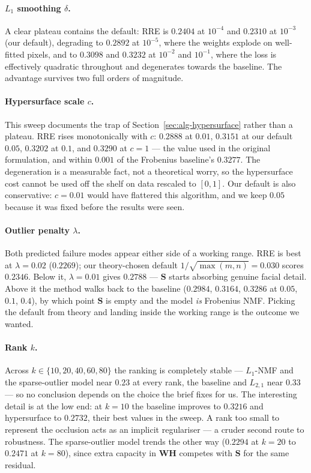 \documentclass[12pt,a4paper]{article}
\newcommand{\bW}{\bm{W}}
\newcommand{\bH}{\bm{H}}
\newcommand{\bS}{\bm{S}}
\begin{document}
\paragraph{$L_1$ smoothing $\delta$.} A clear plateau contains the default: RRE
is $0.2404$ at $10^{-4}$ and $0.2310$ at $10^{-3}$ (our default), degrading to
$0.2892$ at $10^{-5}$, where the weights explode on well-fitted pixels, and to
$0.3098$ and $0.3232$ at $10^{-2}$ and $10^{-1}$, where the loss is effectively
quadratic throughout and degenerates towards the baseline. The advantage
survives two full orders of magnitude.

\paragraph{Hypersurface scale $c$.} This sweep documents the trap of
Section~\ref{sec:alg-hypersurface} rather than a plateau. RRE rises
monotonically with $c$: $0.2888$ at $0.01$, $0.3151$ at our default $0.05$,
$0.3202$ at $0.1$, and $0.3290$ at $c=1$ --- the value used in the original
formulation, and within $0.001$ of the Frobenius baseline's $0.3277$. The
degeneration is a measurable fact, not a theoretical worry, so the hypersurface
cost cannot be used off the shelf on data rescaled to $[0,1]$. Our default is
also conservative: $c=0.01$ would have flattered this algorithm, and we keep
$0.05$ because it was fixed before the results were seen.

\paragraph{Outlier penalty $\lambda$.} Both predicted failure modes appear
either side of a working range. RRE is best at $\lambda = 0.02$ ($0.2269$); our
theory-chosen default $1/\sqrt{\max(m,n)} = 0.030$ scores $0.2346$. Below it,
$\lambda = 0.01$ gives $0.2788$ --- $\bS$ starts absorbing genuine facial
detail. Above it the method walks back to the baseline ($0.2984$, $0.3164$,
$0.3286$ at $0.05$, $0.1$, $0.4$), by which point $\bS$ is empty and the model
\emph{is} Frobenius NMF. Picking the default from theory and landing inside the
working range is the outcome we wanted.

\paragraph{Rank $k$.} Across $k \in \{10,20,40,60,80\}$ the ranking is
completely stable --- $L_1$-NMF and the sparse-outlier model near $0.23$ at
every rank, the baseline and $L_{2,1}$ near $0.33$ --- so no conclusion depends
on the choice the brief fixes for us. The interesting detail is at the low end:
at $k=10$ the baseline improves to $0.3216$ and hypersurface to $0.2732$, their
best values in the sweep. A rank too small to represent the occlusion acts as
an implicit regulariser --- a cruder second route to robustness. The
sparse-outlier model trends the other way ($0.2294$ at $k=20$ to $0.2471$ at
$k=80$), since extra capacity in $\bW\bH$ competes with $\bS$ for the same
residual.
\end{document}
